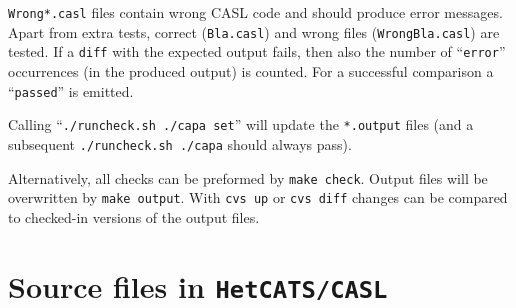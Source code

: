 \documentclass{article}
\begin{document}
\texttt{Wrong*.casl} files contain wrong CASL code and should produce
error messages. Apart from extra tests, correct (\texttt{Bla.casl})
and wrong files (\texttt{WrongBla.casl}) are tested. If a \texttt{diff}
with the expected output fails, then also the number of
``\texttt{error}'' occurrences (in the produced output) is counted. For a
successful comparison a ``\texttt{passed}'' is emitted.

Calling ``\texttt{./runcheck.sh ./capa set}'' will update the
\texttt{*.output} files (and a subsequent \texttt{./runcheck.sh ./capa} should
always pass). 

Alternatively, all checks can be preformed by \texttt{make check}. Output
files will be overwritten by \texttt{make output}. With \texttt{cvs up} or
\texttt{cvs diff} changes can be compared to checked-in versions of the output
files.

\section{Source files in \texttt{HetCATS/CASL}}
\end{document}
